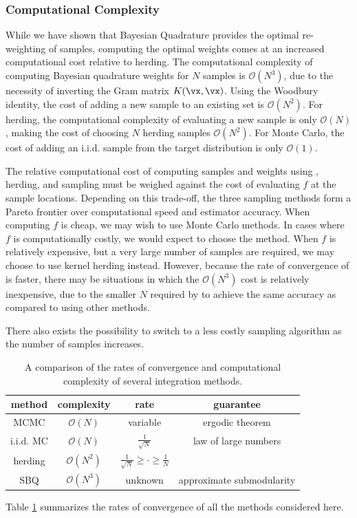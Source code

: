 \subsubsection{Computational Complexity}

While we have shown that Bayesian Quadrature provides the optimal re-weighting of samples, computing the optimal weights comes at an increased computational cost relative to herding. 
%
The computational complexity of computing Bayesian quadrature weights for $N$ samples is $\mathcal{O}(N^3)$, due to the necessity of inverting the Gram matrix $K(\vx, \vx)$.  Using the Woodbury identity, the cost of adding a new sample to an existing set is $\mathcal{O}(N^2)$.  For herding, the computational complexity of evaluating a new sample is only $\mathcal{O}(N)$, making the cost of choosing $N$ herding samples $\mathcal{O}(N^2)$.  For Monte Carlo, the cost of adding an i.i.d. sample from the target distribution is only $\mathcal{O}(1)$.

The relative computational cost of computing samples and weights using \bq{}, herding, and sampling must be weighed against the cost of evaluating $f$ at the sample locations.  Depending on this trade-off, the three sampling methods form a Pareto frontier over computational speed and estimator accuracy.  When computing $f$ is cheap, we may wish to use Monte Carlo methods.  In cases where $f$ is computationally costly, we would expect to choose the \sbq{} method.  When $f$ is relatively expensive, but a very large number of samples are required, we may choose to use kernel herding instead.  However, because the rate of convergence of \sbq{} is faster, there may be situations in which the $\mathcal{O}(N^3)$ cost is relatively inexpensive, due to the smaller $N$ required by \sbq{} to achieve the same accuracy as compared to using other methods.  

There also exists the possibility to switch to a less costly sampling algorithm as the number of samples increases.
%
\begin{table}[t]
\begin{center}
\begin{tabular}{c|ccc}
method & complexity & rate & guarantee\\
\midrule
MCMC & $\mathcal{O}(N)$ & variable & ergodic theorem\\
i.i.d. MC & $\mathcal{O}(N)$ & $\frac{1}{\sqrt{N}}$ & law of large numbers\\
herding & $\mathcal{O}(N^2)$ & $\frac{1}{\sqrt{N}} \geq \cdot \geq \frac{1}{N}$ & \citep{chen2010super,bach2012equivalence} \\
SBQ & $\mathcal{O}(N^3)$ & unknown & approximate submodularity\\
\end{tabular}
\end{center}
\caption{A comparison of the rates of convergence and computational complexity of several integration methods.}
\label{tbl:rates}
\end{table}
%
Table \ref{tbl:rates} summarizes the rates of convergence of all the methods considered here.

